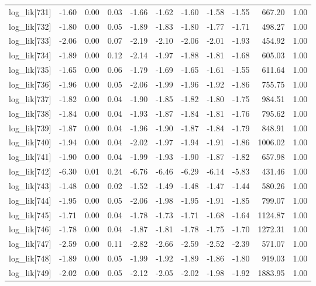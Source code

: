 \begin{table}[ht]
\begin{tabular}{rrrrrrrrrrr}
  log\_lik[731] & -1.60 & 0.00 & 0.03 & -1.66 & -1.62 & -1.60 & -1.58 & -1.55 & 667.20 & 1.00 \\ 
  log\_lik[732] & -1.80 & 0.00 & 0.05 & -1.89 & -1.83 & -1.80 & -1.77 & -1.71 & 498.27 & 1.00 \\ 
  log\_lik[733] & -2.06 & 0.00 & 0.07 & -2.19 & -2.10 & -2.06 & -2.01 & -1.93 & 454.92 & 1.00 \\ 
  log\_lik[734] & -1.89 & 0.00 & 0.12 & -2.14 & -1.97 & -1.88 & -1.81 & -1.68 & 605.03 & 1.00 \\ 
  log\_lik[735] & -1.65 & 0.00 & 0.06 & -1.79 & -1.69 & -1.65 & -1.61 & -1.55 & 611.64 & 1.00 \\ 
  log\_lik[736] & -1.96 & 0.00 & 0.05 & -2.06 & -1.99 & -1.96 & -1.92 & -1.86 & 755.75 & 1.00 \\ 
  log\_lik[737] & -1.82 & 0.00 & 0.04 & -1.90 & -1.85 & -1.82 & -1.80 & -1.75 & 984.51 & 1.00 \\ 
  log\_lik[738] & -1.84 & 0.00 & 0.04 & -1.93 & -1.87 & -1.84 & -1.81 & -1.76 & 795.62 & 1.00 \\ 
  log\_lik[739] & -1.87 & 0.00 & 0.04 & -1.96 & -1.90 & -1.87 & -1.84 & -1.79 & 848.91 & 1.00 \\ 
  log\_lik[740] & -1.94 & 0.00 & 0.04 & -2.02 & -1.97 & -1.94 & -1.91 & -1.86 & 1006.02 & 1.00 \\ 
  log\_lik[741] & -1.90 & 0.00 & 0.04 & -1.99 & -1.93 & -1.90 & -1.87 & -1.82 & 657.98 & 1.00 \\ 
  log\_lik[742] & -6.30 & 0.01 & 0.24 & -6.76 & -6.46 & -6.29 & -6.14 & -5.83 & 431.46 & 1.00 \\ 
  log\_lik[743] & -1.48 & 0.00 & 0.02 & -1.52 & -1.49 & -1.48 & -1.47 & -1.44 & 580.26 & 1.00 \\ 
  log\_lik[744] & -1.95 & 0.00 & 0.05 & -2.06 & -1.98 & -1.95 & -1.91 & -1.85 & 799.07 & 1.00 \\ 
  log\_lik[745] & -1.71 & 0.00 & 0.04 & -1.78 & -1.73 & -1.71 & -1.68 & -1.64 & 1124.87 & 1.00 \\ 
  log\_lik[746] & -1.78 & 0.00 & 0.04 & -1.87 & -1.81 & -1.78 & -1.75 & -1.70 & 1272.31 & 1.00 \\ 
  log\_lik[747] & -2.59 & 0.00 & 0.11 & -2.82 & -2.66 & -2.59 & -2.52 & -2.39 & 571.07 & 1.00 \\ 
  log\_lik[748] & -1.89 & 0.00 & 0.05 & -1.99 & -1.92 & -1.89 & -1.86 & -1.80 & 919.03 & 1.00 \\ 
  log\_lik[749] & -2.02 & 0.00 & 0.05 & -2.12 & -2.05 & -2.02 & -1.98 & -1.92 & 1883.95 & 1.00 \\ 

\end{tabular}
\end{table}
